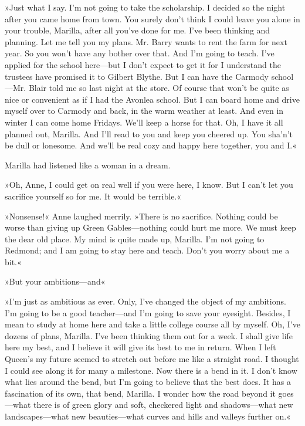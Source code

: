 »Just what I say. I’m not going to take the scholarship. I decided so the night after you came home from town. You surely don’t think I could leave you alone in your trouble, Marilla, after all you’ve done for me. I’ve been thinking and planning. Let me tell you my plans. Mr. Barry wants to rent the farm for next year. So you won’t have any bother over that. And I’m going to teach. I’ve applied for the school here—but I don’t expect to get it for I understand the trustees have promised it to Gilbert Blythe. But I can have the Carmody school—Mr. Blair told me so last night at the store. Of course that won’t be quite as nice or convenient as if I had the Avonlea school. But I can board home and drive myself over to Carmody and back, in the warm weather at least. And even in winter I can come home Fridays. We’ll keep a horse for that. Oh, I have it all planned out, Marilla. And I’ll read to you and keep you cheered up. You sha’n’t be dull or lonesome. And we’ll be real cozy and happy here together, you and I.«

Marilla had listened like a woman in a dream.

»Oh, Anne, I could get on real well if you were here, I know. But I can’t let you sacrifice yourself so for me. It would be terrible.«

»Nonsense!« Anne laughed merrily. »There is no sacrifice. Nothing could be worse than giving up Green Gables—nothing could hurt me more. We must keep the dear old place. My mind is quite made up, Marilla. I’m not going to Redmond; and I am going to stay here and teach. Don’t you worry about me a bit.«

»But your ambitions—and\longdash«

»I’m just as ambitious as ever. Only, I’ve changed the object of my ambitions. I’m going to be a good teacher—and I’m going to save your eyesight. Besides, I mean to study at home here and take a little college course all by myself. Oh, I’ve dozens of plans, Marilla. I’ve been thinking them out for a week. I shall give life here my best, and I believe it will give its best to me in return. When I left Queen’s my future seemed to stretch out before me like a straight road. I thought I could see along it for many a milestone. Now there is a bend in it. I don’t know what lies around the bend, but I’m going to believe that the best does. It has a fascination of its own, that bend, Marilla. I wonder how the road beyond it goes—what there is of green glory and soft, checkered light and shadows—what new landscapes—what new beauties—what curves and hills and valleys further on.«

